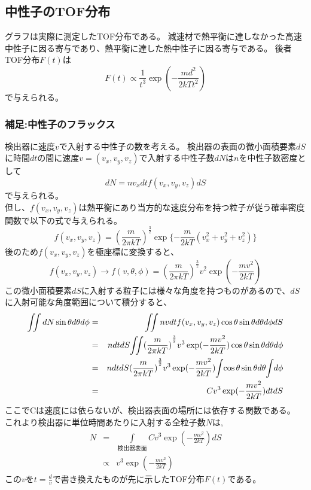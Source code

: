 \subsection {中性子のTOF分布}
グラフは実際に測定したTOF分布である。
減速材で熱平衡に達しなかった高速中性子に因る寄与であり、熱平衡に達した熱中性子に因る寄与である。
後者TOF分布$F(t)$は\begin{equation}F(t)\propto \frac{1}{t^{3}}\exp(-\frac{md^2}{2kTt^2}) \end{equation}で与えられる。
\subsubsection{補足:中性子のフラックス}
検出器に速度$v$で入射する中性子の数を考える。
検出器の表面の微小面積要素$dS$に時間$dt$の間に速度$v=(v_x,v_y,v_z)$で入射する中性子数$dN$は$n$を中性子数密度として
\begin{equation}
dN=nv_xdtf(v_x,v_y,v_z)dS
\end{equation}
で与えられる。\\
但し、$f(v_x,v_y,v_z)$は熱平衡にあり当方的な速度分布を持つ粒子が従う確率密度関数で以下の式で与えられる。
\begin{equation}
f(v_x,v_y,v_z)={(\frac{m}{2\pi kT})}^{\frac{3}{2}}\exp\{-\frac{m}{2kT}(v^2_x+v^2_y+v^2_z)\} 
\end{equation}
後のため$f(v_x,v_y,v_z)$を極座標に変換すると、
\begin{equation}
f(v_x,v_y,v_z) \rightarrow f(v,\theta,\phi)={(\frac{m}{2\pi kT})}^{\frac{3}{2}}v^2\exp(-\frac{mv^2}{2kT})
\end{equation}
この微小面積要素$dS$に入射する粒子には様々な角度を持つものがあるので、$dS$に入射可能な角度範囲について積分すると、
\begin{eqnarray*}
 \iint dN\sin\theta d\theta d\phi &=&\iint nvdtf(v_x,v_y,v_z)\cos\theta \sin\theta d\theta d\phi dS \\ 
&=&ndtdS \hspace{-2pt}\iint \hspace{-2pt}{(\frac{m}{2\pi kT})}^{\frac{3}{2}}v^3\exp(-\frac{mv^2}{2kT})\cos\theta \sin\theta d\theta d\phi  \\
&=&ndtdS{(\frac{m}{2\pi kT})}^{\frac{3}{2}} v^3\exp(-\frac{mv^2}{2kT}) \hspace{-2pt}\int \hspace{-2pt}\cos\theta\sin\theta d\theta \hspace{-2pt}\int \hspace{-2pt} d\phi \\
&=&Cv^3\exp(-\frac{mv^2}{2kT})dtdS
\end{eqnarray*}
ここでCは速度には依らないが、検出器表面の場所には依存する関数である。
これより検出器に単位時間あたりに入射する全粒子数$N$は,
\begin{eqnarray*}
N &=&
\int\limits_{\text{} 検出器表面}Cv^3\exp(-\frac{mv^2}{2kT})dS \\
&\propto& v^3\exp(-\frac{mv^2}{2kT})
\end{eqnarray*}
この$v$を$t=\frac{d}{v}$で書き換えたものが先に示したTOF分布$F(t)$である。
